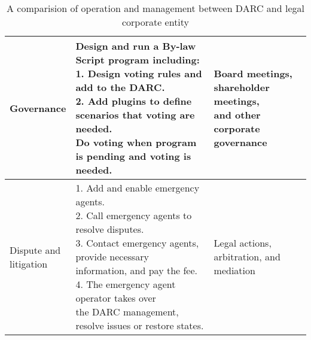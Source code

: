 \documentclass[main.tex]{subfiles}
\begin{document}
\begin{table}[h!]
\begin{tabular}{| l | l| l|}
    Governance & \makecell[l]{Design and run a By-law Script program including: \\ 1. Design voting rules and add to the DARC. \\ 2. Add plugins to define scenarios that voting are needed. \\ Do voting when program is pending and voting is needed. } & \makecell[l]{Board meetings, \\ shareholder meetings, \\ and other corporate governance} \\
    \hline 
    \makecell[l]{Dispute and \\ litigation} & \makecell[l]{1. Add and enable emergency agents. \\ 2. Call emergency agents to resolve disputes. \\ 3. Contact emergency agents,  provide necessary \\ information, and pay the fee. \\ 4. The emergency agent operator takes over \\ the  DARC management, resolve issues or restore states.} & \makecell[l]{Legal actions, \\ arbitration, and mediation} \\
    \hline
    
    
    
        \hline
    \end{tabular}
    \caption{A comparision of operation and management between DARC and legal corporate entity}
    \label{table:5}
    \end{table}
\end{document}
